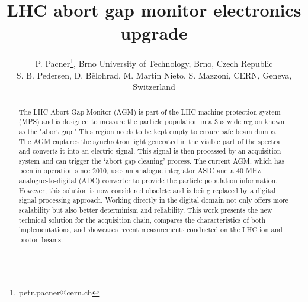 



\title{LHC abort gap monitor electronics upgrade}

\author{P. Pacner\thanks{petr.pacner@cern.ch}, Brno University of Technology, Brno, Czech Republic \\
		S. B. Pedersen, D. B\v{e}lohrad, M. Martin Nieto, S. Mazzoni, CERN, Geneva, Switzerland}
	
\maketitle

\begin{abstract}
    The LHC Abort Gap Monitor (AGM) is part of the LHC machine protection
    system (MPS) and is designed to measure the particle population in a 3us
    wide region known as the "abort gap." This region needs to be kept empty to
    ensure safe beam dumps. The AGM captures the synchrotron light generated in
    the visible part of the spectra and converts it into an electric signal.
    This signal is then processed by an acquisition system and can trigger the
    ‘abort gap cleaning’ process. The current AGM, which has been in operation
    since 2010, uses an analogue integrator ASIC and a 40 MHz
    analogue-to-digital (ADC) converter to provide the particle population
    information. However, this solution is now considered obsolete and is being
    replaced by a digital signal processing approach. Working directly in the
    digital domain not only offers more scalability but also better determinism
    and reliability. This work presents the new technical solution for the
    acquisition chain, compares the characteristics of both implementations,
    and showcases recent measurements conducted on the LHC ion and proton
    beams.
\end{abstract}

